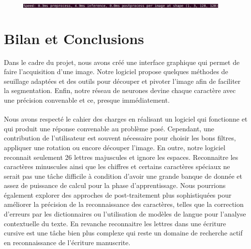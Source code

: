 \documentclass[a4paper]{article}
\begin{document}
			\begin{figure}[h]
				\centering
				\includegraphics[width=0.95\textwidth]{speedYOLO.png}
				\caption{}
				\label{fig:speedYOLO}
			\end{figure}

	\newpage
	\section*{Bilan et Conclusions}%

		\paragraph{}
		Dans le cadre du projet, nous avons créé une interface graphique qui permet de faire l'acquisition d'une image.
		Notre logiciel propose quelques méthodes de seuillage adaptées et des outils pour découper et pivoter l'image afin de faciliter la segmentation.
		Enfin, notre réseau de neurones devine chaque caractère avec une précision convenable et ce, presque immédiatement.
		
		\paragraph{}
		Nous avons respecté le cahier des charges en réalisant un logiciel qui fonctionne et qui produit une réponse convenable au problème posé.
		Cependant, une contribution de l'utilisateur est souvent nécessaire pour choisir les bons filtres, appliquer une rotation ou encore découper l'image. 
		En outre, notre logiciel reconnait seulement 26 lettres majuscules et ignore les espaces.
		Reconnaitre les caractères minuscules ainsi que les chiffres et certains caractères spéciaux ne serait pas une tâche difficile à condition d'avoir une grande banque de donnée et assez de puissance de calcul pour la phase d'apprentissage.
		Nous pourrions également explorer des approches de post-traitement plus sophistiquées pour améliorer la précision de la reconnaissance des caractères, telles que la correction d'erreurs par les dictionnaires ou l'utilisation de modèles de langue pour l'analyse contextuelle du texte.
		En revanche reconnaitre les lettres dans une écriture cursive est une tâche bien plus complexe qui reste un domaine de recherche actif en reconnaissance de l'écriture manuscrite.
		
\end{document}
